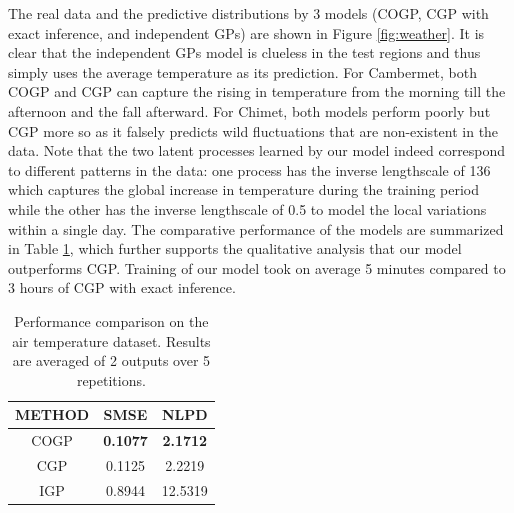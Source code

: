 The real data and the predictive distributions by 3 models (COGP, CGP with exact inference, and independent GPs) are shown in Figure \ref{fig:weather}.
It is clear that the independent GPs model is clueless in the test regions and thus simply uses the average temperature as its prediction.
For Cambermet, both COGP and CGP can capture the rising in temperature from the morning till the afternoon and the fall afterward.
For Chimet, both models perform poorly but CGP more so as it falsely predicts  wild fluctuations that are non-existent in the data. 
Note that the two latent processes learned by our model indeed correspond to different patterns in the data: one process has the inverse lengthscale of 136 which captures the global increase in temperature during the training period while the other has the inverse lengthscale of 0.5 to model the local variations within a single day.
The comparative performance of the models are summarized in Table \ref{tab:air}, which further supports the qualitative analysis that our model outperforms CGP.
Training of our model took on average 5 minutes compared to 3 hours of CGP with exact inference.

\setlength{\tabcolsep}{4pt}
\begin{table}[t]
\caption{Performance comparison on the air temperature dataset. Results are averaged of 2 outputs over 5 repetitions. }
\label{tab:air}
\begin{center}
\begin{tabular}{ccc}
\toprule
\textbf{METHOD} & \textbf{SMSE} & \textbf{NLPD} \\
\hline
COGP & \textbf{0.1077} & \textbf{2.1712} \\
CGP & 0.1125 & 2.2219 \\
IGP & 0.8944 & 12.5319 \\
\bottomrule
\end{tabular}
\end{center}
\end{table}

